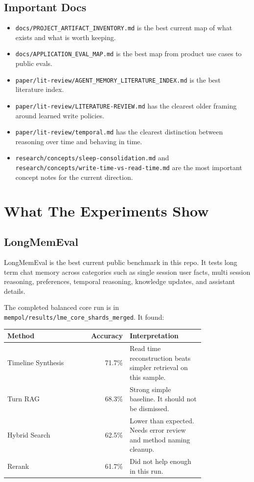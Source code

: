 \documentclass[11pt]{article}
\begin{document}
\subsection{Important Docs}

\begin{itemize}
  \item \texttt{docs/PROJECT\_ARTIFACT\_INVENTORY.md} is the best current map of what exists and what is worth keeping.
  \item \texttt{docs/APPLICATION\_EVAL\_MAP.md} is the best map from product use cases to public evals.
  \item \texttt{paper/lit-review/AGENT\_MEMORY\_LITERATURE\_INDEX.md} is the best literature index.
  \item \texttt{paper/lit-review/LITERATURE-REVIEW.md} has the clearest older framing around learned write policies.
  \item \texttt{paper/lit-review/temporal.md} has the clearest distinction between reasoning over time and behaving in time.
  \item \texttt{research/concepts/sleep-consolidation.md} and \texttt{research/concepts/write-time-vs-read-time.md} are the most important concept notes for the current direction.
\end{itemize}

\section{What The Experiments Show}

\subsection{LongMemEval}

LongMemEval is the best current public benchmark in this repo. It tests long term chat memory across categories such as single session user facts, multi session reasoning, preferences, temporal reasoning, knowledge updates, and assistant details.

The completed balanced core run is in \texttt{mempol/results/lme\_core\_shards\_merged}. It found:

\begin{longtable}{p{0.42\linewidth} r p{0.38\linewidth}}
\toprule
Method & Accuracy & Interpretation \\
\midrule
Timeline Synthesis & 71.7\% & Read time reconstruction beats simpler retrieval on this sample. \\
Turn RAG & 68.3\% & Strong simple baseline. It should not be dismissed. \\
Hybrid Search & 62.5\% & Lower than expected. Needs error review and method naming cleanup. \\
Rerank & 61.7\% & Did not help enough in this run. \\
\bottomrule
\end{longtable}
\end{document}
